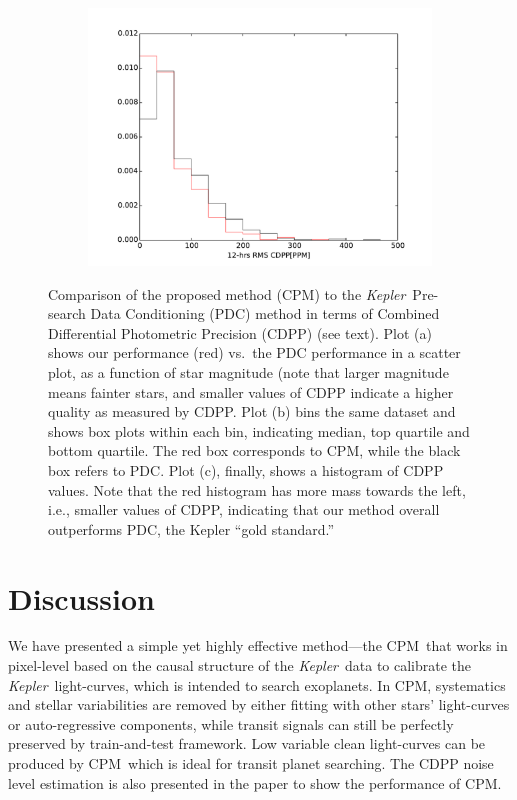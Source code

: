 \documentclass[12pt, preprint]{aastex}
\newcommand{\project}[1]{\textsl{#1}}
\newcommand{\Kepler}{\project{Kepler}}
\newcommand{\name}{CPM}
\begin{document}
\begin{figure}[htb]
\begin{subfigure}[htb]{0.33\columnwidth}
\includegraphics[width=\columnwidth]{pdc_cdpp12_hist_r100}
\caption{}
\end{subfigure}
\caption{
  \label{cdpp} 
  Comparison of the proposed method (\name) to the \Kepler\ Pre-search Data Conditioning (PDC) method 
    in terms of Combined Differential Photometric Precision (CDPP) (see text). 
  Plot (a) shows our performance (red) vs.\ the PDC performance in a scatter plot, as a function of star magnitude 
    (note that larger magnitude means fainter stars, 
    and smaller values of CDPP indicate a higher quality as measured by CDPP.  
  Plot (b) bins the same dataset and shows box plots within each bin, 
    indicating median, top quartile and bottom quartile. 
  The red box corresponds to \name, while the black box refers to PDC. 
  Plot (c), finally, shows a histogram of CDPP values. 
  Note that the red histogram has more mass towards the left, i.e., smaller values of CDPP, 
    indicating that our method overall outperforms PDC, the Kepler ``gold standard.'' 
}
\end{figure}

\clearpage

\section{Discussion}
We have presented a simple yet highly effective method---the \name\ that works in pixel-level 
  based on the causal structure of the \Kepler\ data to calibrate the \Kepler\ light-curves, 
  which is intended to search exoplanets.
In \name, systematics and stellar variabilities are removed by
  either fitting with other stars' light-curves or auto-regressive components,
  while transit signals can still be perfectly preserved by train-and-test framework.
Low variable clean light-curves can be produced by \name\,  
  which is ideal for transit planet searching. 
The CDPP noise level estimation is also presented in the paper to show the performance of \name. 
\end{document}
